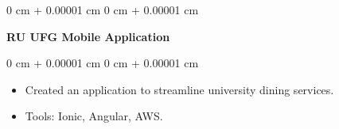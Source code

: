 \documentclass[10pt, letterpaper]{article}
\newenvironment{highlights}{
    \begin{itemize}[
        topsep=0.10 cm,
        parsep=0.10 cm,
        partopsep=0pt,
        itemsep=0pt,
        leftmargin=0 cm + 10pt
    ]
}{
    \end{itemize}
} %
\newenvironment{onecolentry}{
    \begin{adjustwidth}{
        0 cm + 0.00001 cm
    }{
        0 cm + 0.00001 cm
    }
}{
    \end{adjustwidth}
} %
\begin{document}
    \vspace{0.2 cm}

    \begin{onecolentry}
        \textbf{RU UFG Mobile Application}
    \end{onecolentry}
    \vspace{0.10 cm}
    \begin{onecolentry}
        \begin{highlights}
            \item Created an application to streamline university dining services.
            \item Tools: Ionic, Angular, AWS.
        \end{highlights}
    \end{onecolentry}
\end{document}
